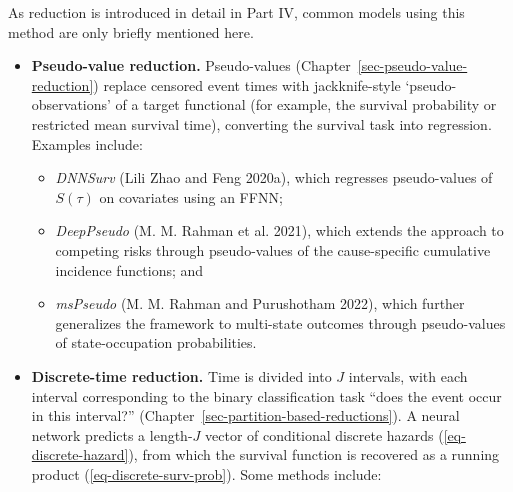 \documentclass[
  letterpaper,
  krantz2]{style/krantz}
\providecommand{\tightlist}{%
  \setlength{\itemsep}{0pt}\setlength{\parskip}{0pt}}
\begin{document}
As reduction is introduced in detail in Part IV, common models using
this method are only briefly mentioned here.

\begin{itemize}
\tightlist
\item
  \textbf{Pseudo-value reduction.} Pseudo-values
  (Chapter~\ref{sec-pseudo-value-reduction}) replace censored event
  times with jackknife-style `pseudo-observations' of a target
  functional (for example, the survival probability or restricted mean
  survival time), converting the survival task into regression. Examples
  include:

  \begin{itemize}
  \tightlist
  \item
    \emph{DNNSurv} (Lili Zhao and Feng 2020a), which regresses
    pseudo-values of \(S(\tau)\) on covariates using an
    FFNN;
  \item
    \emph{DeepPseudo} (M. M. Rahman et al. 2021), which extends the
    approach to competing risks through pseudo-values of the
    cause-specific cumulative incidence functions;
    and
  \item
    \emph{msPseudo} (M. M. Rahman and Purushotham 2022), which further
    generalizes the framework to multi-state outcomes through
    pseudo-values of state-occupation
    probabilities.
  \end{itemize}
\item
  \textbf{Discrete-time reduction.} Time is divided into \(J\)
  intervals, with each interval corresponding to the binary
  classification task ``does the event occur in this
  interval?''
  (Chapter~\ref{sec-partition-based-reductions}). A neural network
  predicts a length-\(J\) vector of conditional discrete hazards
  (\ref{eq-discrete-hazard}), from which the survival function is
  recovered as a running product (\ref{eq-discrete-surv-prob}). Some
  methods include:


\end{itemize}
\end{document}
